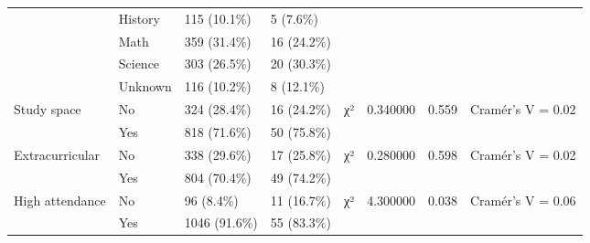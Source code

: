\begin{table}
\begin{tabular}{llllllll}
 & History & 115 (10.1\%) & 5 (7.6\%) &  &  &  &  \\
 & Math & 359 (31.4\%) & 16 (24.2\%) &  &  &  &  \\
 & Science & 303 (26.5\%) & 20 (30.3\%) &  &  &  &  \\
 & Unknown & 116 (10.2\%) & 8 (12.1\%) &  &  &  &  \\
Study space & No & 324 (28.4\%) & 16 (24.2\%) & χ² & 0.340000 & 0.559 & Cramér's V = 0.02 \\
 & Yes & 818 (71.6\%) & 50 (75.8\%) &  &  &  &  \\
Extracurricular & No & 338 (29.6\%) & 17 (25.8\%) & χ² & 0.280000 & 0.598 & Cramér's V = 0.02 \\
 & Yes & 804 (70.4\%) & 49 (74.2\%) &  &  &  &  \\
High attendance & No & 96 (8.4\%) & 11 (16.7\%) & χ² & 4.300000 & 0.038 & Cramér's V = 0.06 \\
 & Yes & 1046 (91.6\%) & 55 (83.3\%) &  &  &  &  \\
\bottomrule
\end{tabular}
\end{table}

